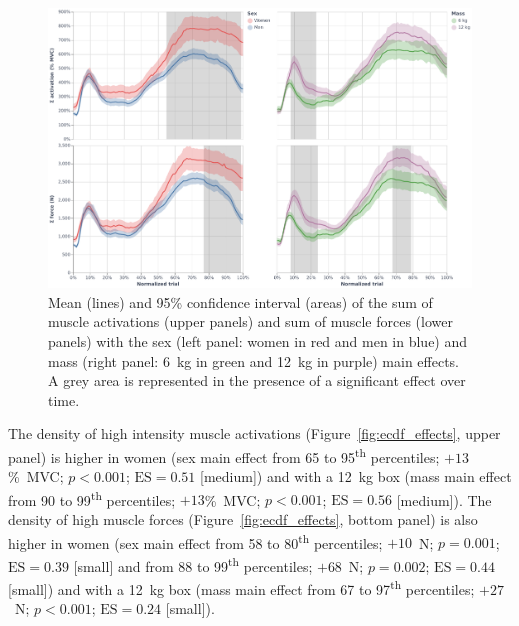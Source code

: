 \begin{figure}[H]
    \centering\includegraphics[width=1\linewidth]{fig/sum_effects.pdf}
    \caption{Mean (lines) and 95\% confidence interval (areas) of the sum of muscle activations (upper panels) and sum of muscle forces (lower panels) with the sex (left panel: women in red and men in blue) and mass (right panel: 6~kg in green and 12~kg in purple) main effects.
    A grey area is represented in the presence of a significant effect over time.}
    \label{fig:sum_effects}
\end{figure}

The density of high intensity muscle activations (Figure~\ref{fig:ecdf_effects}, upper panel) is higher in women (sex main effect from 65 to 95\textsuperscript{th} percentiles; $+13$\%~MVC; $p<0.001$; $\textrm{ES} = 0.51$ [medium]) and with a 12~kg box (mass main effect from 90 to 99\textsuperscript{th} percentiles; $+13$\%~MVC; $p<0.001$; $\textrm{ES} = 0.56$ [medium]).
The density of high muscle forces (Figure~\ref{fig:ecdf_effects}, bottom panel) is also higher in women (sex main effect from 58 to 80\textsuperscript{th} percentiles; $+10$~N; $p = 0.001$; $\textrm{ES} = 0.39$ [small] and from 88 to 99\textsuperscript{th} percentiles; $+68$~N; $p = 0.002$; $\textrm{ES} = 0.44$ [small]) and with a 12~kg box (mass main effect from 67 to 97\textsuperscript{th} percentiles; $+27$~N; $p < 0.001$; $\textrm{ES} = 0.24$ [small]).

